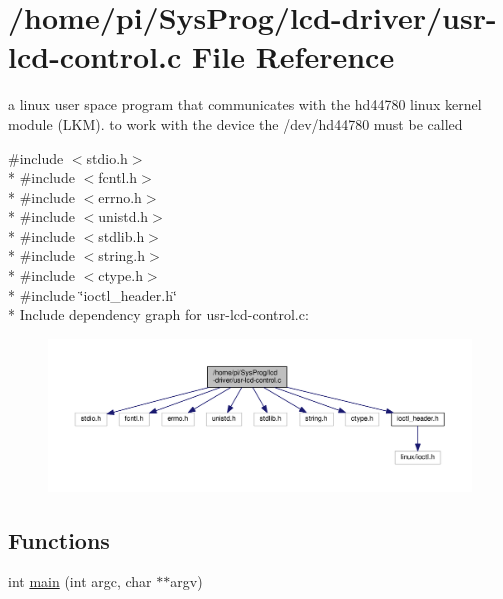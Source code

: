 \hypertarget{usr-lcd-control_8c}{\section{/home/pi/\+Sys\+Prog/lcd-\/driver/usr-\/lcd-\/control.c File Reference}
\label{usr-lcd-control_8c}
}


a linux user space program that communicates with the hd44780 linux kernel module (L\+K\+M). to work with the device the /dev/hd44780 must be called  


{\ttfamily \#include $<$stdio.\+h$>$}\\*
{\ttfamily \#include $<$fcntl.\+h$>$}\\*
{\ttfamily \#include $<$errno.\+h$>$}\\*
{\ttfamily \#include $<$unistd.\+h$>$}\\*
{\ttfamily \#include $<$stdlib.\+h$>$}\\*
{\ttfamily \#include $<$string.\+h$>$}\\*
{\ttfamily \#include $<$ctype.\+h$>$}\\*
{\ttfamily \#include \char`\"{}ioctl\+\_\+header.\+h\char`\"{}}\\*
Include dependency graph for usr-\/lcd-\/control.c\+:\nopagebreak
\begin{figure}[H]
\begin{center}
\leavevmode
\includegraphics[width=350pt]{usr-lcd-control_8c__incl}
\end{center}
\end{figure}
\subsection*{Functions}
\begin{DoxyCompactItemize}
\item 
int \hyperlink{usr-lcd-control_8c_a3c04138a5bfe5d72780bb7e82a18e627}{main} (int argc, char $\ast$$\ast$argv)
\end{DoxyCompactItemize}


